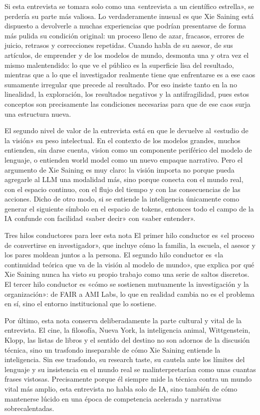 \documentclass[a4paper,12pt]{article}
\begin{document}
Si esta entrevista se tomara solo como una «entrevista a un científico estrella», se perdería su parte más valiosa. Lo verdaderamente inusual es que Xie Saining está dispuesto a devolverle a muchas experiencias que podrían presentarse de forma más pulida su condición original: un proceso lleno de azar, fracasos, errores de juicio, retrasos y correcciones repetidas. Cuando habla de su asesor, de sus artículos, de emprender y de los modelos de mundo, desmonta una y otra vez el mismo malentendido: lo que ve el público es la superficie lisa del resultado, mientras que a lo que el investigador realmente tiene que enfrentarse es a ese caos sumamente irregular que precede al resultado. Por eso insiste tanto en la no linealidad, la exploración, los resultados negativos y la antifragilidad, pues estos conceptos son precisamente las condiciones necesarias para que de ese caos surja una estructura nueva.

El segundo nivel de valor de la entrevista está en que le devuelve al «estudio de la visión» su peso intelectual. En el contexto de los modelos grandes, muchos entienden, sin darse cuenta, vision como un componente periférico del modelo de lenguaje, o entienden world model como un nuevo empaque narrativo. Pero el argumento de Xie Saining es muy claro: la visión importa no porque pueda agregarle al LLM una modalidad más, sino porque conecta con el mundo real, con el espacio continuo, con el flujo del tiempo y con las consecuencias de las acciones. Dicho de otro modo, si se entiende la inteligencia únicamente como generar el siguiente símbolo en el espacio de tokens, entonces todo el campo de la IA confunde con facilidad «saber decir» con «saber entender».

\begin{importantbox}{Tres hilos conductores para leer esta nota}
El primer hilo conductor es «el proceso de convertirse en investigador», que incluye cómo la familia, la escuela, el asesor y los pares moldean juntos a la persona. El segundo hilo conductor es «la continuidad teórica que va de la visión al modelo de mundo», que explica por qué Xie Saining nunca ha visto su propio trabajo como una serie de saltos discretos. El tercer hilo conductor es «cómo se sostienen mutuamente la investigación y la organización»: de FAIR a AMI Labs, lo que en realidad cambia no es el problema en sí, sino el entorno institucional que lo sostiene.
\end{importantbox}

Por último, esta nota conserva deliberadamente la parte cultural y vital de la entrevista. El cine, la filosofía, Nueva York, la inteligencia animal, Wittgenstein, Klopp, las listas de libros y el sentido del destino no son adornos de la discusión técnica, sino un trasfondo inseparable de cómo Xie Saining entiende la inteligencia. Sin ese trasfondo, su research taste, su cautela ante los límites del lenguaje y su insistencia en el mundo real se malinterpretarían como unas cuantas frases vistosas. Precisamente porque él siempre mide la técnica contra un mundo vital más amplio, esta entrevista no habla solo de IA, sino también de cómo mantenerse lúcido en una época de competencia acelerada y narrativas sobrecalentadas.
\end{document}
